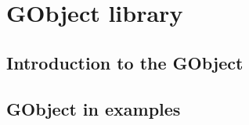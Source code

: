 
\section{GObject library}
\label{gobject}

\subsection{Introduction to the GObject}

\subsection{GObject in examples}
